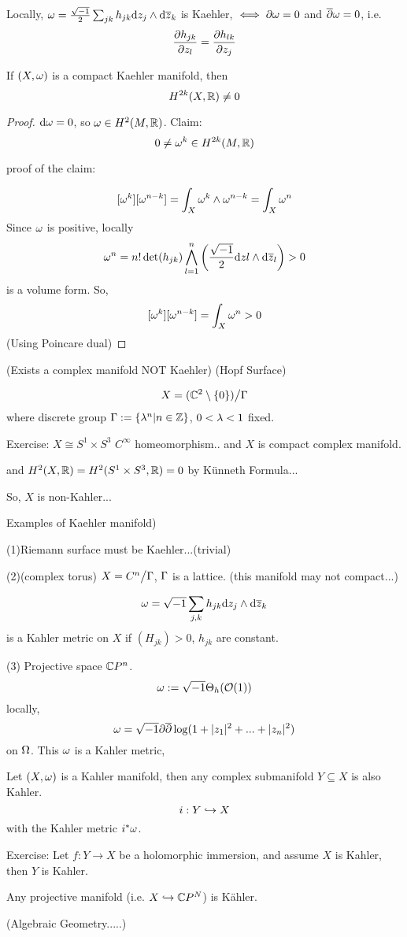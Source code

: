 \begin{prop}
Locally, $\omega=\frac{\sqrt{-1}}{2}\sum_{jk} h_{jk}\mathrm{d} z_j\wedge\mathrm{d} \overline{z}_k$
is Kaehler, $\iff \partial\omega=0$ and $\overline{\partial}\omega=0$, i.e.
$$\frac{\partial h_{jk}} {\partial z_l}=\frac{\partial h_{lk}} {\partial z_j}$$

If $(X,\omega)$ is a compact Kaehler manifold, then
$$H^{2k}(X,\mathbb{R})\neq 0$$
\end{prop}

\begin{proof}
$\mathrm{d}\omega=0$, so $\omega\in H^2(M,\mathbb{R})$. Claim:
$$0\neq \omega^k\in H^{2k}(M,\mathbb{R})$$

proof of the claim:

$$[\omega^k][\omega^{n-k}]=\int_X\omega^k\wedge\omega^{n-k}=\int_X\omega^n$$
Since $\omega$ is positive,  locally
$$\omega^n=n!\det(h_{jk})
\bigwedge_{l=1}^n\left(
\frac{\sqrt{-1}}{2}\mathrm{d} zl\wedge\mathrm{d}\overline{z}_l
\right)>0
$$
is a volume form. So,
$$[\omega^k][\omega^{n-k}]=\int_{X}\omega^n>0$$
(Using Poincare dual)
\end{proof}

\begin{example}(Exists a complex manifold NOT Kaehler)
(Hopf Surface)

$$X=(\mathbb{C}^2\setminus\{0\})\big/\Gamma$$
where discrete group $\Gamma:=\{\lambda^n|n\in \mathbb{Z}\}$,
$0<\lambda<1$ fixed.
\end{example}

Exercise: $X\cong S^1\times S^3$ $C^\infty$ homeomorphism..
and $X$ is compact complex manifold.

and $H^2(X,\mathbb{R})=H^2(S^1\times S^3,\mathbb{R})=0$
by K\"{u}nneth Formula...

So, $X$ is non-Kahler...

\begin{example}Examples of Kaehler manifold)

(1)Riemann surface must be Kaehler...(trivial)

(2)(complex torus) $X=C^n\big/\Gamma$, $\Gamma$ is a lattice.
(this manifold may not compact...)

$$\omega=\sqrt{-1}\sum_{j,k}h_{jk}\mathrm{d} z_j\wedge\mathrm{d}\overline{z}_k$$
is a Kahler metric on $X$ if $(H_{jk})>0$, $h_{jk}$ are constant.

(3) Projective space $\mathbb{C} P^n$.
$$\omega:=\sqrt{-1}\Theta_h(\mathcal{O}(1))$$
locally,
$$\omega=\sqrt{-1}\partial\overline{\partial}\log(1+|z_1|^2+...+|z_n|^2)$$
on $\Omega$. This $\omega$ is a Kahler metric,
\end{example}

\begin{example}
Let $(X,\omega)$ is a Kahler manifold,
then  any complex submanifold $Y\subseteq X$ is also Kahler.
$$i:Y\hookrightarrow X$$
with the Kahler metric $i^*\omega$.
\end{example}
Exercise: Let $f:Y\to X$ be a holomorphic immersion, and assume $X$ is Kahler,
then $Y$ is Kahler.
\begin{cor}
Any projective manifold (i.e. $X\hookrightarrow \mathbb{C} P^N$) is K\"{a}hler.
\end{cor}
(Algebraic Geometry.....)

